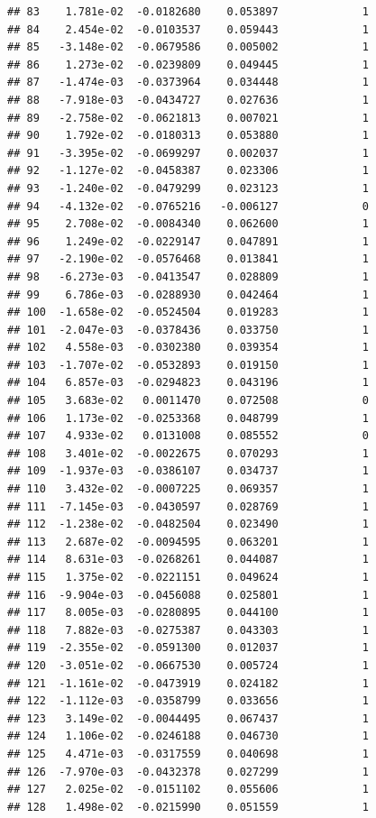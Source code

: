 \documentclass[12pt]{article}\usepackage[]{graphicx}\usepackage[]{xcolor}
\makeatletter
\newenvironment{kframe}{%
 \def\at@end@of@kframe{}%
 \ifinner\ifhmode%
  \def\at@end@of@kframe{\end{minipage}}%
  \begin{minipage}{\columnwidth}%
 \fi\fi%
 \def\FrameCommand##1{\hskip\@totalleftmargin \hskip-\fboxsep
 \colorbox{shadecolor}{##1}\hskip-\fboxsep
     \hskip-\linewidth \hskip-\@totalleftmargin \hskip\columnwidth}%
 \MakeFramed {\advance\hsize-\width
   \@totalleftmargin\z@ \linewidth\hsize
   \@setminipage}}%
 {\par\unskip\endMakeFramed%
 \at@end@of@kframe}
\newenvironment{knitrout}{}{} %
\makeatother
\begin{document}
\begin{knitrout}
\begin{kframe}
\begin{verbatim}
## 83    1.781e-02  -0.0182680    0.053897             1
## 84    2.454e-02  -0.0103537    0.059443             1
## 85   -3.148e-02  -0.0679586    0.005002             1
## 86    1.273e-02  -0.0239809    0.049445             1
## 87   -1.474e-03  -0.0373964    0.034448             1
## 88   -7.918e-03  -0.0434727    0.027636             1
## 89   -2.758e-02  -0.0621813    0.007021             1
## 90    1.792e-02  -0.0180313    0.053880             1
## 91   -3.395e-02  -0.0699297    0.002037             1
## 92   -1.127e-02  -0.0458387    0.023306             1
## 93   -1.240e-02  -0.0479299    0.023123             1
## 94   -4.132e-02  -0.0765216   -0.006127             0
## 95    2.708e-02  -0.0084340    0.062600             1
## 96    1.249e-02  -0.0229147    0.047891             1
## 97   -2.190e-02  -0.0576468    0.013841             1
## 98   -6.273e-03  -0.0413547    0.028809             1
## 99    6.786e-03  -0.0288930    0.042464             1
## 100  -1.658e-02  -0.0524504    0.019283             1
## 101  -2.047e-03  -0.0378436    0.033750             1
## 102   4.558e-03  -0.0302380    0.039354             1
## 103  -1.707e-02  -0.0532893    0.019150             1
## 104   6.857e-03  -0.0294823    0.043196             1
## 105   3.683e-02   0.0011470    0.072508             0
## 106   1.173e-02  -0.0253368    0.048799             1
## 107   4.933e-02   0.0131008    0.085552             0
## 108   3.401e-02  -0.0022675    0.070293             1
## 109  -1.937e-03  -0.0386107    0.034737             1
## 110   3.432e-02  -0.0007225    0.069357             1
## 111  -7.145e-03  -0.0430597    0.028769             1
## 112  -1.238e-02  -0.0482504    0.023490             1
## 113   2.687e-02  -0.0094595    0.063201             1
## 114   8.631e-03  -0.0268261    0.044087             1
## 115   1.375e-02  -0.0221151    0.049624             1
## 116  -9.904e-03  -0.0456088    0.025801             1
## 117   8.005e-03  -0.0280895    0.044100             1
## 118   7.882e-03  -0.0275387    0.043303             1
## 119  -2.355e-02  -0.0591300    0.012037             1
## 120  -3.051e-02  -0.0667530    0.005724             1
## 121  -1.161e-02  -0.0473919    0.024182             1
## 122  -1.112e-03  -0.0358799    0.033656             1
## 123   3.149e-02  -0.0044495    0.067437             1
## 124   1.106e-02  -0.0246188    0.046730             1
## 125   4.471e-03  -0.0317559    0.040698             1
## 126  -7.970e-03  -0.0432378    0.027299             1
## 127   2.025e-02  -0.0151102    0.055606             1
## 128   1.498e-02  -0.0215990    0.051559             1

\end{verbatim}
\end{kframe}
\end{knitrout}
\end{document}
